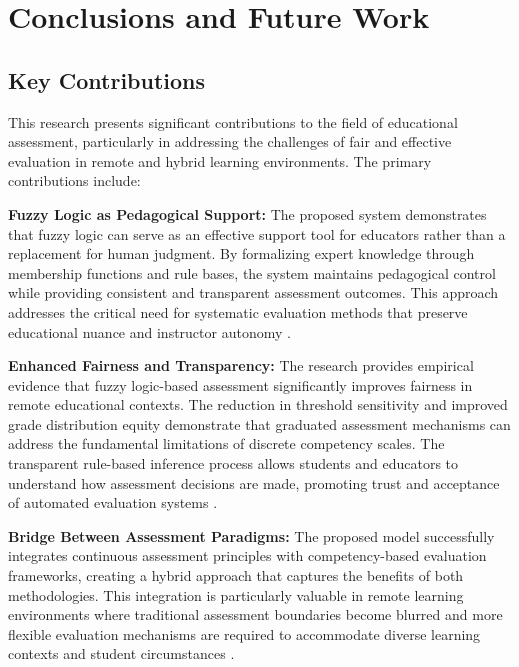 
\section{Conclusions and Future Work}

\subsection{Key Contributions}

This research presents significant contributions to the field of educational assessment, particularly in addressing the challenges of fair and effective evaluation in remote and hybrid learning environments. The primary contributions include:

\textbf{Fuzzy Logic as Pedagogical Support:} The proposed system demonstrates that fuzzy logic can serve as an effective support tool for educators rather than a replacement for human judgment. By formalizing expert knowledge through membership functions and rule bases, the system maintains pedagogical control while providing consistent and transparent assessment outcomes. This approach addresses the critical need for systematic evaluation methods that preserve educational nuance and instructor autonomy \cite{Chen2023, Ahmed2023}.

\textbf{Enhanced Fairness and Transparency:} The research provides empirical evidence that fuzzy logic-based assessment significantly improves fairness in remote educational contexts. The reduction in threshold sensitivity and improved grade distribution equity demonstrate that graduated assessment mechanisms can address the fundamental limitations of discrete competency scales. The transparent rule-based inference process allows students and educators to understand how assessment decisions are made, promoting trust and acceptance of automated evaluation systems \cite{Kumar2023, Garcia2024}.

\textbf{Bridge Between Assessment Paradigms:} The proposed model successfully integrates continuous assessment principles with competency-based evaluation frameworks, creating a hybrid approach that captures the benefits of both methodologies. This integration is particularly valuable in remote learning environments where traditional assessment boundaries become blurred and more flexible evaluation mechanisms are required to accommodate diverse learning contexts and student circumstances \cite{Martinez2024, Brown2024}.

